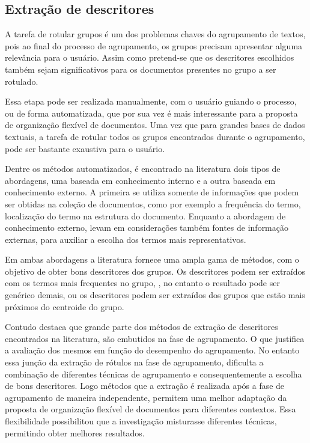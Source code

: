 \subsection{Extração de descritores}

A tarefa de rotular grupos é um dos problemas chaves do agrupamento de textos, 
pois ao final do processo de agrupamento, os grupos precisam apresentar alguma relevância para 
o usuário\cite{Zhang2008}. Assim como pretend-se que os descritores escolhidos também sejam 
significativos para os documentos presentes no grupo a ser rotulado. 

Essa etapa pode ser realizada manualmente, com o usuário guiando o processo, ou de forma 
automatizada, que por sua vez é mais interessante para a proposta de organização flexível de 
documentos. Uma vez que para grandes bases de dados textuais, a tarefa de rotular todos os grupos
encontrados durante o agrupamento, pode ser bastante exaustiva para o usuário.

Dentre os métodos automatizados, é encontrado na literatura dois tipos de abordagens, uma 
baseada em conhecimento interno e a outra baseada em conhecimento externo\cite{Nogueira2013}. 
A primeira se utiliza somente de informações que podem ser obtidas na coleção de documentos, 
como por exemplo a frequência do termo, localização do termo na estrutura do documento.
Enquanto a abordagem de conhecimento externo, levam em considerações também fontes de informação
externas, para auxiliar a escolha dos termos mais representativos. 

Em ambas abordagens a literatura fornece uma ampla gama de métodos, com o objetivo de obter bons
descritores dos grupos. Os descritores podem ser extraídos com os termos mais frequentes no grupo,
, no entanto o resultado pode ser genérico demais\cite{Pucktada2006}, ou os descritores podem
ser extraídos dos grupos que estão mais próximos do centroide do grupo.

Contudo \cite{Nogueira2013} destaca que grande parte dos métodos de extração de descritores 
encontrados na literatura, são embutidos na fase de agrupamento. O que justifica a avaliação 
dos mesmos em função do desempenho do agrupamento. No entanto essa junção da extração de rótulos
na fase de agrupamento, dificulta a combinação de diferentes técnicas de agrupamento e 
consequentemente a escolha de bons descritores. Logo métodos que a extração é realizada 
após a fase de agrupamento
de maneira independente, permitem uma melhor adaptação da proposta de organização flexível de 
documentos para diferentes contextos. Essa flexibilidade possibilitou que a investigação
misturasse diferentes técnicas, permitindo obter melhores resultados.





